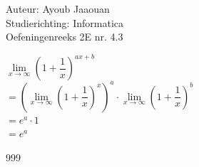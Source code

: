 \documentclass[a4paper]{article}
\begin{document}
\noindent \large Auteur: Ayoub Jaaouan \\
\noindent \large Studierichting: Informatica\\
\noindent \large Oefeningenreeks 2E nr. 4.3\\

\medskip

\normalsize

$\lim\limits_{x \to \infty} \left( 1 + \dfrac{1}{x} \right)^{ax+b}$  \\

$= \left(\lim\limits_{x \to \infty} \left( 1 + \dfrac{1}{x} \right)^x\right)^a \cdot \lim\limits_{x \to \infty} \left( 1 + \dfrac{1}{x} \right)^b$  \\

$= e^a \cdot 1$\\

$= e^a $\\


\begin{thebibliography}{999}
\end{thebibliography}
\end{document}
